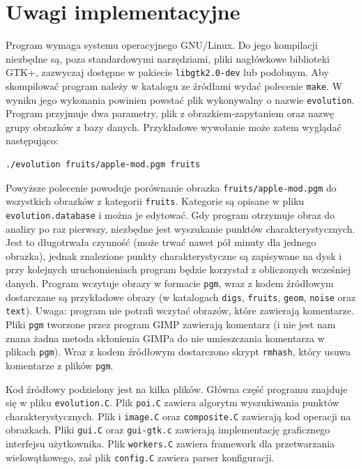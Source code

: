 \documentclass[a4paper,12pt,leqno]{article}
\begin{document}
\section{Uwagi implementacyjne}

Program wymaga systemu operacyjnego GNU/Linux. Do jego kompilacji niezbędne są, poza standardowymi narzędziami, pliki nagłówkowe biblioteki GTK+,
zazwyczaj dostępne w pakiecie \texttt{libgtk2.0-dev} lub podobnym. Aby skompilować program należy w katalogu ze źródłami wydać polecenie \texttt{make}.
W wyniku jego wykonania powinien powstać plik wykonywalny o nazwie \texttt{evolution}. Program przyjmuje dwa parametry, plik z obrazkiem-zapytaniem oraz
nazwę grupy obrazków z bazy danych. Przykładowe wywołanie może zatem wyglądać następująco:
\begin{verbatim}./evolution fruits/apple-mod.pgm fruits\end{verbatim}
Powyższe polecenie powoduje porównanie obrazka \texttt{fruits/apple-mod.pgm} do wszystkich obrazków z kategorii \texttt{fruits}.
Kategorie są opisane w pliku \texttt{evolution.database} i można je edytować. Gdy program otrzymuje obraz do analizy po raz pierwszy, niezbędne jest
wyszukanie punktów charakterystycznych. Jest to długotrwała czynność (może trwać nawet pół minuty dla jednego obrazka), jednak znalezione punkty
charakterystyczne są zapisywane na dysk i przy kolejnych uruchomieniach program będzie korzystał z obliczonych wcześniej danych. Program wczytuje
obrazy w formacie \texttt{pgm}, wraz z kodem źródłowym dostarczane są przykładowe obrazy (w katalogach \texttt{digs}, \texttt{fruits}, \texttt{geom},
\texttt{noise} oraz \texttt{text}). Uwaga: program nie potrafi wczytać obrazów, które zawierają komentarze. Pliki \texttt{pgm} tworzone przez program
GIMP zawierają komentarz (i nie jest nam znana żadna metoda skłonienia GIMPa do nie umieszczania komentarza w plikach \texttt{pgm}). Wraz z kodem
źródłowym dostarczono skrypt \texttt{rmhash}, który usuwa komentarze z plików \texttt{pgm}.

Kod źródłowy podzielony jest na kilka plików. Główna część programu znajduje się w pliku \texttt{evolution.C}. Plik \texttt{poi.C} zawiera algorytm
wyszukiwania punktów charakterystycznych. Plik i \texttt{image.C} oraz \texttt{composite.C} zawierają kod operacji na obrazkach. Pliki \texttt{gui.C}
oraz \texttt{gui-gtk.c} zawierają implementację graficznego interfejsu użytkownika. Plik \texttt{workers.C} zawiera framework dla przetwarzania
wielowątkowego, zaś plik \texttt{config.C} zawiera parser konfiguracji.
\end{document}
